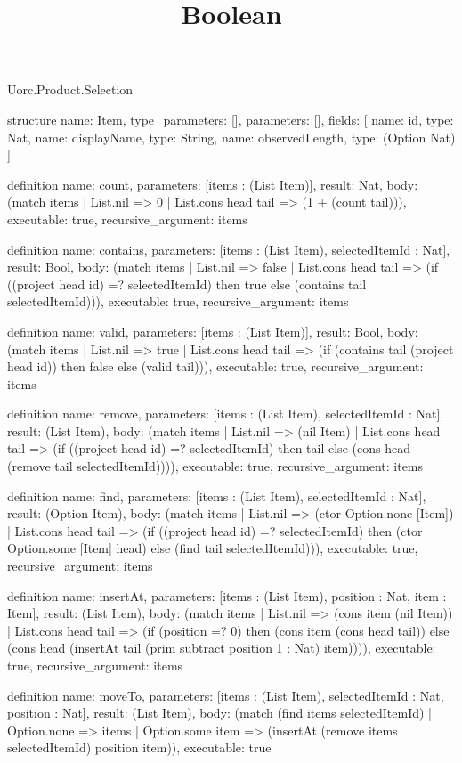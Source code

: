 \begin{lexlean}{Uorc.Product.Selection}
\title{Boolean}
\begin{semanticmodule}
structure{
  name: Item,
  type_parameters: [],
  parameters: [],
  fields: [
    {name: id, type: Nat},
    {name: displayName, type: String},
    {name: observedLength, type: (Option Nat)}
  ]
}

definition{
  name: count,
  parameters: [items : (List Item)],
  result: Nat,
  body: (match items | List.nil => 0 | List.cons head tail => (1 + (count tail))),
  executable: true,
  recursive_argument: items
}

definition{
  name: contains,
  parameters: [items : (List Item), selectedItemId : Nat],
  result: Bool,
  body: (match items
    | List.nil => false
    | List.cons head tail => (if ((project head id) =? selectedItemId) then true else (contains tail selectedItemId))),
  executable: true,
  recursive_argument: items
}

definition{
  name: valid,
  parameters: [items : (List Item)],
  result: Bool,
  body: (match items
    | List.nil => true
    | List.cons head tail => (if (contains tail (project head id)) then false else (valid tail))),
  executable: true,
  recursive_argument: items
}

definition{
  name: remove,
  parameters: [items : (List Item), selectedItemId : Nat],
  result: (List Item),
  body: (match items
    | List.nil => (nil Item)
    | List.cons head tail => (if ((project head id) =? selectedItemId) then tail else (cons head (remove tail selectedItemId)))),
  executable: true,
  recursive_argument: items
}

definition{
  name: find,
  parameters: [items : (List Item), selectedItemId : Nat],
  result: (Option Item),
  body: (match items
    | List.nil => (ctor Option.none [Item])
    | List.cons head tail => (if ((project head id) =? selectedItemId) then (ctor Option.some [Item] head) else (find tail selectedItemId))),
  executable: true,
  recursive_argument: items
}

definition{
  name: insertAt,
  parameters: [items : (List Item), position : Nat, item : Item],
  result: (List Item),
  body: (match items
    | List.nil => (cons item (nil Item))
    | List.cons head tail => (if (position =? 0) then (cons item (cons head tail)) else (cons head (insertAt tail (prim subtract position 1 : Nat) item)))),
  executable: true,
  recursive_argument: items
}

definition{
  name: moveTo,
  parameters: [items : (List Item), selectedItemId : Nat, position : Nat],
  result: (List Item),
  body: (match (find items selectedItemId)
    | Option.none => items
    | Option.some item => (insertAt (remove items selectedItemId) position item)),
  executable: true
}


\end{semanticmodule}
\end{lexlean}
